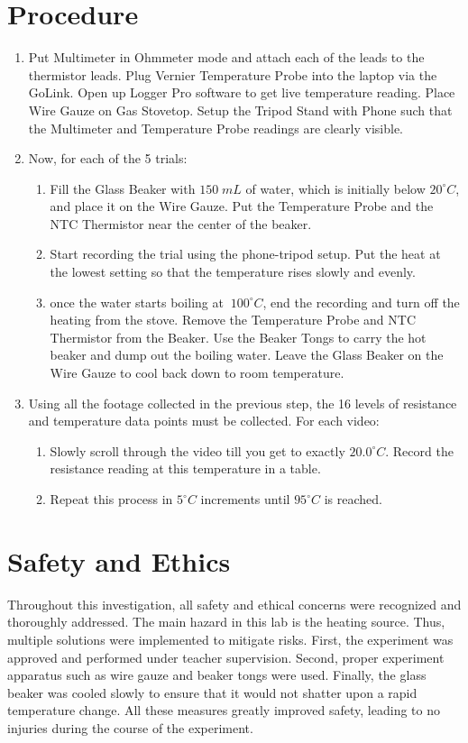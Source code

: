 \section{Procedure}
\label{section:procedure}
\begin{enumerate}[noitemsep]
    \item Put Multimeter in Ohmmeter mode and attach each of the leads to the thermistor leads. Plug Vernier Temperature Probe into the laptop via the GoLink. Open up Logger Pro software to get live temperature reading. Place Wire Gauze on Gas Stovetop. Setup the Tripod Stand with Phone such that the Multimeter and Temperature Probe readings are clearly visible.
    \item Now, for each of the 5 trials:
    \begin{enumerate}[noitemsep]
        \item Fill the Glass Beaker with $150 \; mL$ of water, which is initially below $20^\circ C$, and place it on the Wire Gauze. Put the Temperature Probe and the NTC Thermistor near the center of the beaker.
        \item Start recording the trial using the phone-tripod setup. Put the heat at the lowest setting so that the temperature rises slowly and evenly.
        \item once the water starts boiling at $~100^\circ C$, end the recording and turn off the heating from the stove. Remove the Temperature Probe and NTC Thermistor from the Beaker. Use the Beaker Tongs to carry the hot beaker and dump out the boiling water. Leave the Glass Beaker on the Wire Gauze to cool back down to room temperature.
    \end{enumerate}
    \item Using all the footage collected in the previous step, the 16 levels of resistance and temperature data points must be collected. For each video:
    \begin{enumerate}[noitemsep]
        \item Slowly scroll through the video till you get to exactly $20.0^\circ C$. Record the resistance reading at this temperature in a table.
        \item Repeat this process in $5^\circ C$ increments until $95^\circ C$ is reached. 
    \end{enumerate}
\end{enumerate}

\section{Safety and Ethics}
Throughout this investigation, all safety and ethical concerns were recognized and thoroughly addressed. The main hazard in this lab is the heating source. Thus, multiple solutions were implemented to mitigate risks. First, the experiment was approved and performed under teacher supervision. Second, proper experiment apparatus such as wire gauze and beaker tongs were used. Finally, the glass beaker was cooled slowly to ensure that it would not shatter upon a rapid temperature change. All these measures greatly improved safety, leading to no injuries during the course of the experiment.